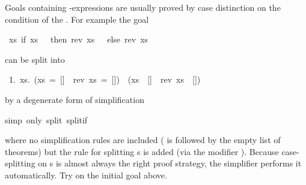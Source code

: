 %
\begin{isabellebody}%
%
\begin{isamarkuptext}%
Goals containing -expressions are usually proved by case
distinction on the condition of the . For example the goal%
\end{isamarkuptext}%
\ {\isachardoublequote}{\isasymforall}xs{\isachardot}\ if\ xs\ {\isacharequal}\ {\isacharbrackleft}{\isacharbrackright}\ then\ rev\ xs\ {\isacharequal}\ {\isacharbrackleft}{\isacharbrackright}\ else\ rev\ xs\ {\isasymnoteq}\ {\isacharbrackleft}{\isacharbrackright}{\isachardoublequote}%
\begin{isamarkuptxt}%
\noindent
can be split into
\begin{isabelle}
~1.~{\isasymforall}xs.~(xs~=~[]~{\isasymlongrightarrow}~rev~xs~=~[])~{\isasymand}~(xs~{\isasymnoteq}~[]~{\isasymlongrightarrow}~rev~xs~{\isasymnoteq}~[])%
\end{isabelle}
by a degenerate form of simplification%
\end{isamarkuptxt}%
simp\ only{\isacharcolon}\ split{\isacharcolon}\ split{\isacharunderscore}if{\isacharparenright}%
\begin{isamarkuptext}%
\noindent
where no simplification rules are included ( is followed by the
empty list of theorems) but the rule  for
splitting s is added (via the modifier ). Because
case-splitting on s is almost always the right proof strategy, the
simplifier performs it automatically. Try 
on the initial goal above.


\end{isamarkuptext}
\end{isabellebody}
